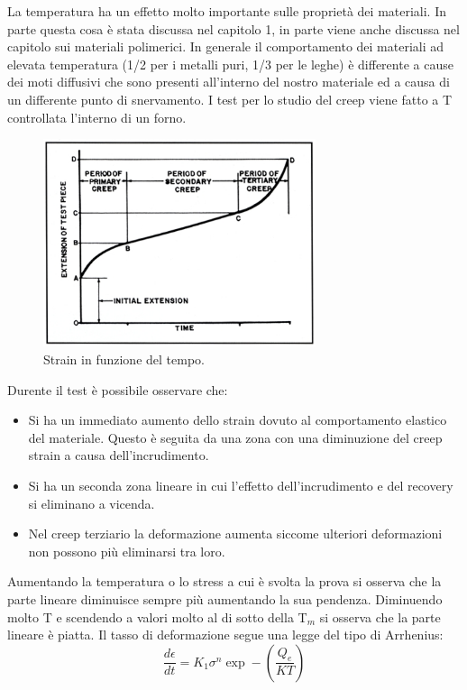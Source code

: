 La temperatura ha un effetto molto importante sulle proprietà dei materiali. In parte questa cosa è stata discussa nel capitolo 1, in parte viene anche discussa nel capitolo sui materiali polimerici. In generale il comportamento dei materiali ad elevata temperatura (1/2 per i metalli puri, 1/3 per le leghe) è differente a cause dei moti diffusivi che sono presenti all'interno del nostro materiale ed a causa di un differente punto di snervamento. I test per lo studio del creep viene fatto a T controllata l'interno di un forno. 
\begin{figure}[h]
    \centering
    \includegraphics[width=8cm]{frattura/creep testing.jpg}
    \caption{Strain in funzione del tempo.}
    \label{creep testing}
\end{figure}
Durente il test è possibile osservare che:
\begin{itemize}
    \item Si ha un immediato aumento dello strain dovuto al comportamento elastico del materiale. Questo è seguita da una zona con una diminuzione del creep strain a causa dell'incrudimento.
    \item Si ha un seconda zona lineare in cui l'effetto dell'incrudimento e del recovery si eliminano a vicenda.
    \item Nel creep terziario la deformazione aumenta siccome ulteriori deformazioni non possono più eliminarsi tra loro.
\end{itemize}
Aumentando la temperatura o lo stress a cui è svolta la prova si osserva che la parte lineare diminuisce sempre più aumentando la sua pendenza. Diminuendo molto T e scendendo a valori molto al di sotto della T$_m$ si osserva che la parte lineare è  piatta.
Il tasso di deformazione segue una legge del tipo di Arrhenius:
\begin{equation}
    \frac{d\epsilon}{dt}=K_1\sigma^n\exp-\left(\frac{Q_e}{KT}\right)
\end{equation}

